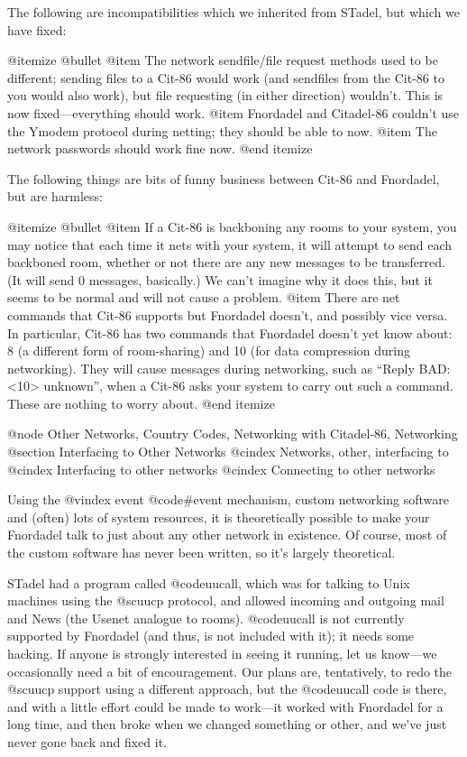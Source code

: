 {{{{The following are incompatibilities which we inherited from STadel,
but which we have fixed:

@itemize @bullet
@item
The network sendfile/file request methods used to be different;
sending files to a Cit-86 would work (and sendfiles from the Cit-86 to
you would also work), but file requesting (in either direction)
wouldn't.  This is now fixed---everything should work.
@item
Fnordadel and Citadel-86 couldn't use the Ymodem protocol
during netting; they should be able to now.
@item
The network passwords should work fine now.
@end itemize

The following things are bits of funny business between Cit-86 and
Fnordadel, but are harmless:

@itemize @bullet
@item
If a Cit-86 is backboning any rooms to your system, you may notice
that each time it nets with your system, it will attempt to send
each backboned room, whether or not there are any new messages to be
transferred.  (It will send 0 messages, basically.)  We can't imagine why
it does this, but it seems to be normal and will not cause a problem.
@item
There are net commands that Cit-86 supports but Fnordadel doesn't,
and possibly vice versa.  In particular, Cit-86 has two commands
that Fnordadel doesn't yet know about: 8 (a different form of
room-sharing) and 10 (for data compression during networking).  They
will cause messages during
networking, such as ``Reply BAD: <10> unknown'', when a Cit-86 asks your
system to carry out such a command.  These are nothing to worry about.
@end itemize

@node Other Networks, Country Codes, Networking with Citadel-86, Networking
@section Interfacing to Other Networks
@cindex Networks, other, interfacing to
@cindex Interfacing to other networks
@cindex Connecting to other networks

Using the
@vindex event
@code{#event} mechanism, custom networking software and (often)
lots of system resources, it is theoretically possible to make your
Fnordadel talk to just about any other network in existence.  Of course,
most of the custom software has never been written, so it's largely
theoretical.

STadel had a program called @code{uucall}, which was for talking to
Unix machines using the @sc{uucp} protocol, and allowed incoming and outgoing
mail and News (the Usenet analogue to rooms).  @code{uucall} is not currently
supported by Fnordadel (and thus, is not included with it); it needs
some hacking.  If anyone is strongly interested in seeing it running, let
us know---we occasionally need a bit of encouragement.  Our plans
are, tentatively, to redo the @sc{uucp} support using a different approach,
but the @code{uucall} code is there, and with a little effort could be made to
work---it worked with Fnordadel for a long time, and then broke when we
changed something or other, and we've just never gone back and fixed it.

}}}}

